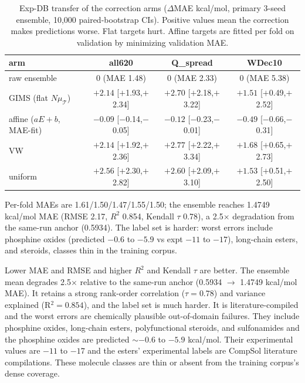 \documentclass{article}
\begin{document}
\begin{table}[t]
  \caption{Exp-DB transfer of the correction arms ($\Delta$MAE kcal/mol,
  primary 3-seed ensemble, 10{,}000 paired-bootstrap CIs). Positive values
  mean the correction makes predictions worse. Flat targets hurt. Affine targets
  are fitted per fold on validation by minimizing validation MAE.}
  \label{tab:expdb-transfer}
  \centering
  \renewcommand{\arraystretch}{1.30}
  \setlength{\tabcolsep}{4pt}
  \small
  \begin{tabular}{l@{\hspace{6pt}}ccc}
    \toprule
    arm & all620 & Q\_spread & WDec10 \\
    \midrule
    raw ensemble & 0 (MAE 1.48) & 0 (MAE 2.33) & 0 (MAE 5.38) \\
    GIMS (flat $N\mu_{\mathcal T}$) & $+2.14$ [$+$1.93,$+$2.34] & $+2.70$ [$+$2.18,$+$3.22] & $+1.51$ [$+$0.49,$+$2.52] \\
    affine ($aE+b$, MAE-fit) & $-0.09$ [$-$0.14,$-$0.05] & $-0.12$ [$-$0.23,$-$0.01] & $-0.49$ [$-$0.66,$-$0.31] \\
    VW & $+2.14$ [$+$1.92,$+$2.36] & $+2.77$ [$+$2.22,$+$3.34] & $+1.68$ [$+$0.65,$+$2.73] \\
    uniform & $+2.56$ [$+$2.30,$+$2.82] & $+2.60$ [$+$2.09,$+$3.10] & $+1.53$ [$+$0.51,$+$2.50] \\
    \bottomrule
  \end{tabular}
\end{table}

Per-fold MAEs are 1.61/1.50/1.47/1.55/1.50; the ensemble reaches
1.4749 kcal/mol MAE (RMSE 2.17, $R^2$ 0.854, Kendall $\tau$ 0.78), a
2.5$\times$ degradation from the same-run anchor (0.5934). The label set
is harder: worst errors include phosphine oxides (predicted $-0.6$ to
$-5.9$ vs expt $-11$ to $-17$), long-chain esters, and steroids, classes
thin in the training corpus.

Lower MAE and RMSE and higher $R^2$ and Kendall $\tau$ are better. The ensemble mean degrades 2.5$\times$ relative to the same-run anchor
(0.5934 $\to$ 1.4749 kcal/mol MAE). It retains a strong rank-order
correlation ($\tau = 0.78$) and variance explained (R$^2 = 0.854$), and the
label set is much harder. It is literature-compiled and the worst errors are
chemically plausible out-of-domain failures. They include phosphine oxides,
long-chain esters, polyfunctional steroids, and sulfonamides and the phosphine
oxides are predicted $\sim -0.6$ to $-5.9$ kcal/mol. Their experimental
values are $-11$ to $-17$ and the esters' experimental labels are CompSol
literature compilations. These molecule classes are thin or absent from the
training corpus's dense coverage.
\end{document}
